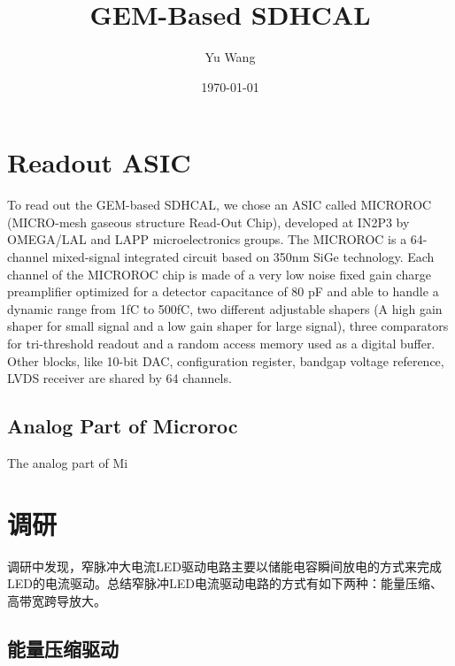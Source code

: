 \documentclass{article}
\title{GEM-Based SDHCAL}
\author{Yu Wang}
\date{\today}
\begin{document}
\maketitle


\section{Readout ASIC}
To read out the GEM-based SDHCAL, we chose an ASIC called MICROROC (MICRO-mesh gaseous structure Read-Out Chip), developed at IN2P3 by OMEGA/LAL and LAPP microelectronics groups. The MICROROC is a 64-channel mixed-signal integrated circuit based on 350nm SiGe technology. Each channel of the MICROROC chip is made of a very low noise fixed gain charge preamplifier optimized for a detector capacitance of 80 pF and able to handle a dynamic range from 1fC to 500fC, two different adjustable shapers (A high gain shaper for small signal and a low gain shaper for large signal), three comparators for tri-threshold readout and a random access memory used as a digital buffer. Other blocks, like 10-bit DAC, configuration register, bandgap voltage reference, LVDS receiver are shared by 64 channels.
\subsection{Analog Part of Microroc}
The analog part of Mi

\section{调研}
调研中发现，窄脉冲大电流LED驱动电路主要以储能电容瞬间放电的方式来完成LED的电流驱动。总结窄脉冲LED电流驱动电路的方式有如下两种：能量压缩、高带宽跨导放大。
\subsection{能量压缩驱动}
\end{document}
